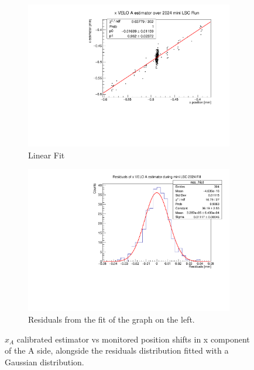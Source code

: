 \begin{figure}
    \centering
    \begin{subfigure}{0.48\textwidth}
    \includegraphics[width=\linewidth]{figures/xVeloA_fit_comparison.pdf}
    \caption{Linear Fit}\label{fig:xAfit_comparison}
    \end{subfigure}
    \begin{subfigure}{0.48\textwidth}
    \includegraphics[width=\linewidth]{figures/xVeloA_res_compariosn.pdf}
    \caption{Residuals from the fit of the graph on the left. }\label{fig:xAres_comparison}
    \end{subfigure}
    \caption{$\hat{x}_{A}$ calibrated estimator vs monitored position shifts in x component of the A side, alongside the residuals distribution fitted with a Gaussian distribution.}
    \label{fig:xA_comaprison}
\end{figure}
